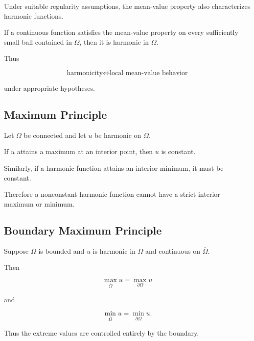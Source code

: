 Under suitable regularity assumptions, the mean-value property also
characterizes harmonic functions.

\begin{theorem}
If a continuous function satisfies the mean-value property on every
sufficiently small ball contained in \(\Omega\), then it is harmonic in
\(\Omega\).
\end{theorem}

Thus

\[
\boxed{
\text{harmonicity}
\Longleftrightarrow
\text{local mean-value behavior}
}
\]

under appropriate hypotheses.

\subsection{Maximum Principle}
\label{subsec:harmonic-maximum-principle}

\begin{theorem}
Let \(\Omega\) be connected and let \(u\) be harmonic on \(\Omega\).

If \(u\) attains a maximum at an interior point, then \(u\) is constant.
\end{theorem}

Similarly, if a harmonic function attains an interior minimum, it must be
constant.

Therefore a nonconstant harmonic function cannot have a strict interior
maximum or minimum.

\subsection{Boundary Maximum Principle}
\label{subsec:boundary-maximum-principle}

Suppose \(\Omega\) is bounded and \(u\) is harmonic in \(\Omega\) and
continuous on \(\overline{\Omega}\).

Then

\[
\boxed{
\max_{\overline{\Omega}}u
=
\max_{\partial\Omega}u
}
\]

and

\[
\boxed{
\min_{\overline{\Omega}}u
=
\min_{\partial\Omega}u.
}
\]

Thus the extreme values are controlled entirely by the boundary.

